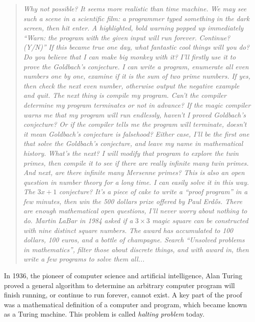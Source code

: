 \documentclass{article}
\begin{document}
\begin{quotation}
\itshape
Why not possible? It seems more realistic than time machine. We may see such a scene in a scientific film: a programmer typed something in the dark screen, then hit enter. A highlighted, bold warning popped up immediately ``Warn: the program with the given input will run forever. Continue? (Y/N)'' If this became true one day, what fantastic cool things will you do? Do you believe that I can make big monkey with it? I'll firstly use it to prove the Goldbach's conjecture. I can write a program, enumerate all even numbers one by one, examine if it is the sum of two prime numbers. If yes, then check the next even number, otherwise output the negative example and quit. The next thing is compile my program. Can't the compiler determine my program terminates or not in advance? If the magic compiler warns me that my program will run endlessly, haven't I proved Goldbach's conjecture? Or if the compiler tells me the program will terminate, doesn't it mean Goldbach's conjecture is falsehood? Either case, I'll be the first one that solve the Goldbach's conjecture, and leave my name in mathematical history. What's the next? I will modify that program to explore the twin primes, then compile it to see if there are really infinite many twin primes. And next, are there infinite many Mersenne primes? This is also an open question in number theory for a long time. I can easily solve it in this way. The $3x + 1$ conjecture? It's a piece of cake to write a ``proof program'' in a few minutes, then win the 500 dollars prize offered by Paul Erdős. There are enough mathematical open questions, I'll never worry about nothing to do. Martin LaBar in 1984 asked if a $3 \times 3$ magic square can be constructed with nine distinct square numbers. The award has accumulated to 100 dollars, 100 euros, and a bottle of champagne. Search ``Unsolved problems in mathematics'', filter those about discrete things, and with award in, then write a few programs to solve them all...
\end{quotation}

In 1936, the pioneer of computer science and artificial intelligence, Alan Turing proved a general algorithm to determine an arbitrary computer program will finish running, or continue to run forever, cannot exist. A key part of the proof was a mathematical definition of a computer and program, which became known as a Turing machine. This problem is called {\em halting problem} today.
\end{document}
